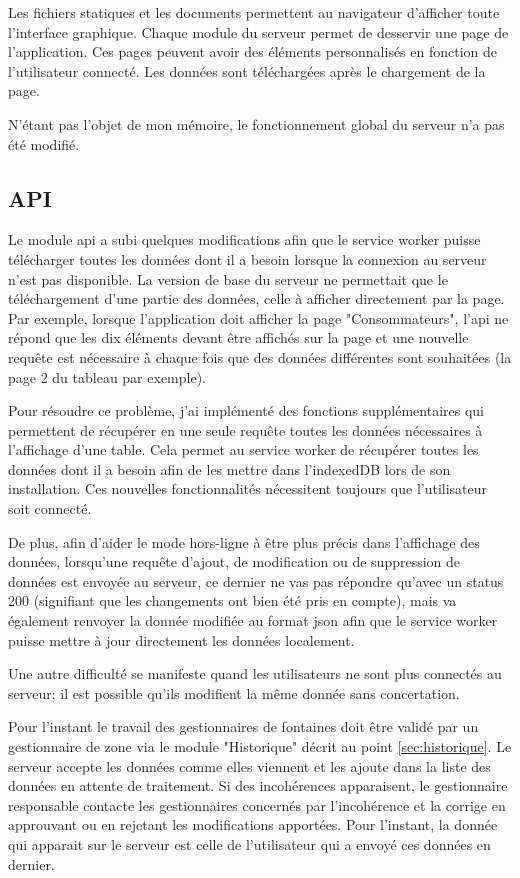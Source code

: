 \documentclass{EPL-master-thesis-covers-FR}
\begin{document}
				Les fichiers statiques et les documents permettent au navigateur d'afficher toute l'interface graphique. Chaque module du serveur permet de desservir une page de l'application. Ces pages peuvent avoir des éléments personnalisés en fonction de l'utilisateur connecté. Les données sont téléchargées après le chargement de la page.
				
				N'étant pas l'objet de mon mémoire, le fonctionnement global du serveur n'a pas été modifié.
				
				
			\subsection*{API}
				\label{sec:api}
				Le module \gls{api} a subi quelques modifications afin que le service worker puisse télécharger toutes les données dont il a besoin lorsque la connexion au serveur n'est pas disponible. La version de base du serveur ne permettait que le téléchargement d'une partie des données, celle à afficher directement par la page. Par exemple, lorsque l'application doit afficher la page "Consommateurs", l'\gls{api} ne répond que les dix éléments devant être affichés sur la page et une nouvelle requête est nécessaire à chaque fois que des données différentes sont souhaitées (la page 2 du tableau par exemple).
				
				Pour résoudre ce problème, j'ai implémenté des fonctions supplémentaires qui permettent de récupérer en une seule requête toutes les données nécessaires à l'affichage d'une table. Cela permet au service worker de récupérer toutes les données dont il a besoin afin de les mettre dans l'indexedDB lors de son installation. Ces nouvelles fonctionnalités nécessitent toujours que l'utilisateur soit connecté.
				
				De plus, afin d'aider le mode hors-ligne à être plus précis dans l'affichage des données, lorsqu'une requête d'ajout, de modification ou de suppression de données est envoyée au serveur, ce dernier ne vas pas répondre qu'avec un status 200 (signifiant que les changements ont bien été pris en compte), mais va également renvoyer la donnée modifiée au format \gls{json} afin que le service worker puisse mettre à jour directement les données localement.
				
				Une autre difficulté se manifeste quand les utilisateurs ne sont plus connectés au serveur; il est possible qu'ils modifient la même donnée sans concertation.
				
				Pour l'instant le travail des gestionnaires de fontaines doit être validé par un gestionnaire de zone via le module "Historique" décrit au point \ref{sec:historique}. Le serveur accepte les données comme elles viennent et les ajoute dans la liste des données en attente de traitement. Si des incohérences apparaisent, le gestionnaire responsable contacte les gestionnaires concernés par l'incohérence et la corrige en approuvant ou en rejetant les modifications apportées. Pour l'instant, la donnée qui apparait sur le serveur est celle de l'utilisateur qui a envoyé ces données en dernier.
			
\end{document}

